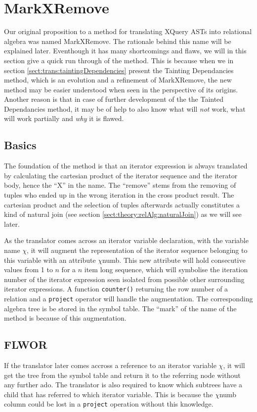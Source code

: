 \section{MarkXRemove}
\label{sect:trans:MarkXRemove}

Our original proposition to a method for translating XQuery ASTs into relational algebra was named MarkXRemove.
The rationale behind this name will be explained later. Eventhough it has many shortcomings and flaws, we
will in this section give a quick run through of the method. This is because when we in section
\ref{sect:trans:taintingDependencies} present the Tainting Dependancies method, which is an evolution and a
refinement of MarkXRemove, the new method may be easier understood when seen in the perspective of its origins.
Another reason is that in case of further development of the the Tainted Dependancies method, it may be of help to
also know what will \textit{not} work, what will work partially and \textit{why} it is flawed.

\subsection{Basics}
\label{sect:trans:mxr:basics}

The foundation of the method is that an iterator expression is always translated by calculating the cartesian
product of the iterator sequence and the iterator body, hence the ``X'' in the name. The ``remove'' stems from the
removing of tuples who ended up in the wrong iteration in the cross product result. The cartesian product and the
selection of tuples afterwards actually constitutes a kind of natural join (see section
\ref{sect:theory:relAlg:naturalJoin}) as we will see later.

As the translator comes across an iterator variable declaration, with the variable name $\chi$, it will augment
the representation of the iterator sequence belonging to this variable with an attribute $\chi$\textsf{numb}.
This new attribute will hold consecutive values from 1 to $n$ for a $n$ item long sequence, which will symbolise the
iteration number of the iterator expression seen isolated from possible other surrounding iterator expressions. A
function \texttt{counter()} returning the row number of a relation and a \texttt{project} operator will handle
the augmentation. The corresponding algebra tree is be stored in the symbol table. The ``mark'' of the name of the
method is because of this augmentation.

\subsection{FLWOR}
\label{sect:trans:mxr:flwor}
If the translator later comes accross a reference to an iterator variable $\chi$, it will get the tree from the
symbol table and return it to the referring node without any further ado. The translator is also required to know
which subtrees have a child that has referred to which iterator variable. This is because the $\chi$\textsf{numb}
column could be lost in a \texttt{project} operation without this knowledge.


